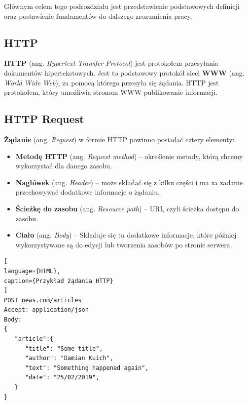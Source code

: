 \documentclass[oneside,polski,logo,indent]{amuthesis}
\begin{document}
Głównym celem tego podrozdziału jest przedstawienie podstawowych definicji oraz postawienie fundamentów do dalszego zrozumienia pracy.

\begin{center}
\subsection{HTTP}
\end{center}

\textbf{HTTP} (ang. \emph{Hypertext Transfer Protocol}) jest protokołem przesyłania dokumentów hipertekstowych. Jest to podstawowy protokół sieci \textbf{WWW} (ang. \emph{World Wide Web}), za pomocą którego przesyła się żądania. HTTP jest protokołem, który umożliwia stronom WWW publikowanie informacji.

\begin{center}
\subsection{HTTP Request}
\end{center}
\textbf{Żądanie} (ang. \emph{Request}) w formie HTTP powinno posiadać cztery elementy:

\begin{itemize}
\item \textbf{Metodę HTTP} (ang. \emph{Request method}) -- określenie metody, którą chcemy wykorzystać dla danego zasobu.
\item \textbf{Nagłówek} (ang. \emph{Header}) -- może składać się z kilku części i ma za zadanie przechowywać dodatkowe informacje o żądaniu.
\item \textbf{Ścieżkę do zasobu} (ang. \emph{Resource path}) -- URI, czyli ścieżka dostępu do zasobu.
\item \textbf{Ciało} (ang. \emph{Body}) -- Składuje się tu dodatkowe informacje, które później wykorzystywane są do edycji lub tworzenia zasobów po stronie serwera.
\end{itemize}



\begin{lstlisting}[
language={HTML},
caption={Przykład żądania HTTP}
]
POST news.com/articles
Accept: application/json
Body:
{
   "article":{    
      "title": "Some title",
      "author": "Damian Kuich",
      "text": "Something happened again",
      "date": "25/02/2019",
   }
}
\end{lstlisting}
\end{document}
